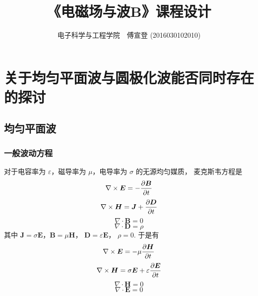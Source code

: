 \documentclass[UTF8,linespread=1.236]{ctexart}
\newcommand\cu[1]{\boldsymbol{#1}}
\newcommand\pypx[2]{{{\partial {#1}} \over {\partial {#2}}}}
\begin{document}
\title{《电磁场与波B》课程设计}
\author{电子科学与工程学院\ \ 傅宣登 (2016030102010)}

\maketitle

\section{关于均匀平面波与圆极化波能否同时存在的探讨}

\subsection{均匀平面波}

\subsubsection{一般波动方程}

对于电容率为 $\varepsilon$，磁导率为 $\mu$，电导率为 $\sigma$
的无源均匀媒质，
麦克斯韦方程是
\begin{equation}%
    \nabla \times \cu{E} = - \pypx{\cu{B}}{t}
\end{equation}
\begin{equation}
    \nabla \times \cu{H} = \cu{J} + \pypx{\cu{D}}{t}
\end{equation}
\begin{equation}
    \nabla \cdot \cu{B} = 0
\end{equation}
\begin{equation}
    \nabla \cdot \cu{D} = \rho
\end{equation}
其中 $\cu{J} = \sigma\cu{E}$，$\cu{B} = \mu\cu{H}$，
$\cu{D} = \varepsilon\cu{E}$，
$\rho = 0$. 于是有
\begin{equation}
    \label{eq81}
    \nabla \times \cu{E} = -\mu \pypx{\cu{H}}{t}
\end{equation}
\begin{equation}
    \label{eq82}
    \nabla \times \cu{H} = \sigma\cu{E} + \varepsilon\pypx{\cu{E}}{t}
\end{equation}
\begin{equation}
    \label{eq83}
    \nabla \cdot \cu{H} = 0
\end{equation}
\begin{equation}
    \label{eq84}
    \nabla \cdot \cu{E} = 0
\end{equation}
\end{document}
